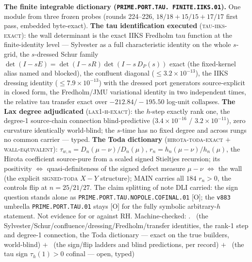 \documentclass[11pt,a4paper]{article}
\theoremstyle{definition}
\begin{document}
\par\smallskip\noindent\textbf{The finite integrable dictionary
(\texttt{PRIME.\allowbreak PORT.\allowbreak TAU.\allowbreak
FINITE.\allowbreak IIKS.01}).}
One module from three frozen probes (rounds 224--226, $18/18 +
15/15 + 17/17$ first pass, embedded byte-exact).  \textbf{The tau
identification executed} (\textsc{tau-iiks-exact}): the wall
determinant is the exact IIKS Fredholm tau function at the
finite-identity level --- Sylvester as a full characteristic
identity on the whole $s$-grid, the $s$-dressed Schur family
$\det(I - sE) = \det(I - sR)\det(I - s\,D_P(s))$ exact (the
fixed-kernel alias named and blocked), the confluent diagonal
($\le 3.2\times10^{-13}$), the IIKS dressing identity
($\le 7.9\times10^{-13}$) with the dressed port generators
source-explicit in closed form, the Fredholm/JMU variational
identity in two independent times, the relative tau transfer
exact over $-212.84/-195.50$ log-unit collapses.  \textbf{The Lax
degree adjudicated} (\textsc{lax1-h-exact}): the $h$-step exactly
rank one, the degree-1 source-chain connection blind-predictive
($3.4\times10^{-16}$ / $3.2\times10^{-11}$), zero curvature
identically world-blind; the $s$-time has no fixed degree and
across rungs no common carrier --- typed.  \textbf{The Toda
dictionary} (\textsc{hirota-toda-exact} $+$
\textsc{wall-equivalent}): $\tau_{w,n} = D_n(\mu - \nu)/D_n(\mu)$,
$r_n = h_n(\mu - \nu)/h_n(\mu)$, the Hirota coefficient
source-pure from a scaled signed Stieltjes recursion; its
positivity $\iff$ quasi-definiteness of the signed defect
measure $\mu - \nu$ $\iff$ the wall (the explicit
\textsc{signed-toda} $X - Y$ structure); MAIN carries all $184$
$r_n > 0$, the controls flip at $n = 25/21/27$.  The claim
splitting of note DLI carried: the sign question stands alone as
\texttt{PRIME.PORT.TAU.NOPOLE.COFINAL.01} [O]; the
\texttt{v883} umbrella \texttt{PRIME.PORT.TAU.01} stays [O] for
the fully symbolic arbitrary-$h$ statement.  Not evidence for or
against RH.
Machine-checked: .
\mE\ (the Sylvester/Schur/confluence/dressing/Fredholm/transfer
identities, the rank-1 step and degree-1 connection, the Toda
dictionary --- exact on the true builders, world-blind) $+$ \mC\
(the sign/flip ladders and blind predictions, per record) $+$
\mO\ (the tau sign $\tau_h(1) > 0$ cofinal --- open, typed)
\par\smallskip
\end{document}
